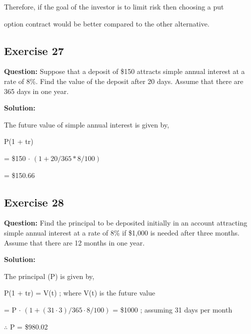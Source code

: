 \documentclass{article}
\begin{document}
\vspace{\baselineskip}

Therefore, if the goal of the investor is to limit risk then choosing a put 

option contract would be better compared to the other alternative. 

\subsection*{Exercise 27}

\textbf{Question:} Suppose that a deposit of \$150 attracts simple annual interest at a rate of 8\%. Find the value of
the deposit after 20 days. Assume that there are 365 days in one year.

\textbf{Solution:}

The future value of simple annual interest is given by,

\vspace{\baselineskip}

P(1 + tr)

\vspace{\baselineskip}

= \$150 $\cdot$ $(1 + 20/365 * 8/100)$ 

\vspace{\baselineskip}

= \$150.66

\subsection*{Exercise 28}

\textbf{Question:} Find the principal to be deposited initially in an account attracting simple annual interest at a rate
of 8\% if \$1,000 is needed after three months. Assume that there are 12 months in one year.

\textbf{Solution:}

The principal (P) is given by,

\vspace{\baselineskip}

P(1 + tr) = V(t) ; where V(t) is the future value

\vspace{\baselineskip}

= P $\cdot$ $(1 + (31 \cdot 3)/365 \cdot 8/100)$ = \$1000 ; assuming 31 days per month

\vspace{\baselineskip}

$\therefore$ P = \$980.02
\end{document}
